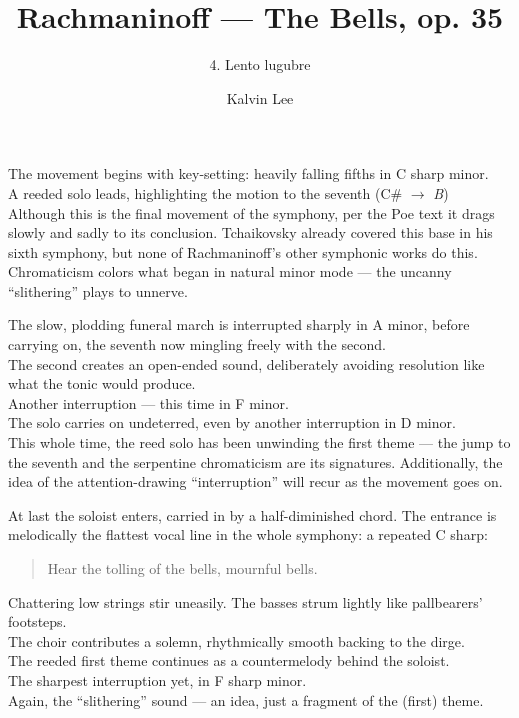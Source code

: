 \documentclass{beamer}
\title{Rachmaninoff --- The Bells, op. 35}
\subtitle{4. Lento lugubre}
\author{Kalvin Lee}
\date{}
\begin{document}
 

\begin{frame} 
  \titlepage
\end{frame} 

\begin{frame}
  The movement begins with key-setting: heavily falling fifths in C sharp minor. 
  \pause \\ 
  A reeded solo leads, highlighting the motion to the seventh (C\# \(\to\) \emph{B}) 
  \pause \\ 
  Although this is the final movement of the symphony, per the Poe text it drags slowly and sadly to its conclusion. Tchaikovsky already covered this base in his sixth symphony, but none of Rachmaninoff's other symphonic works do this. 
  \pause \\
  Chromaticism colors what began in natural minor mode --- the uncanny ``slithering'' plays to unnerve. 
\end{frame} 

\begin{frame} 
  The slow, plodding funeral march is interrupted sharply in A minor, \pause before carrying on, the seventh now mingling freely with the second. 
  \pause \\
  The second creates an open-ended sound, deliberately avoiding resolution like what the tonic would produce. 
  \pause \\ 
  Another interruption --- this time in F minor. 
  \pause \\ 
  The solo carries on undeterred, \pause even by another interruption in D minor. 
  \pause \\ 
  This whole time, the reed solo has been unwinding the first theme --- the jump to the seventh and the serpentine chromaticism are its signatures. Additionally, the idea of the attention-drawing ``interruption'' will recur as the movement goes on. 
\end{frame} 

\begin{frame}
  At last the soloist enters, carried in by a half-diminished chord. The entrance is melodically the flattest vocal line in the whole symphony: a repeated C sharp: 
  \pause \\ 
  \begin{quote} 
    Hear{\pause} the{\pause} toll{\pause}ing{\pause} of{\pause} the{\pause} bells,{\pause} mourn{\pause}ful{\pause} bells.{\pause} 
  \end{quote} 
  Chattering low strings stir uneasily. The basses strum lightly like pallbearers' footsteps. 
  \pause \\ 
  The choir contributes a solemn, rhythmically smooth backing to the dirge. 
  \pause \\ 
  The reeded first theme continues as a countermelody behind the soloist. 
  \pause \\ 
  The sharpest interruption yet, in F sharp minor. 
  \pause \\ 
  Again, the ``slithering'' sound --- an idea, just a fragment of the (first) theme. 
\end{frame} 
\end{document}

